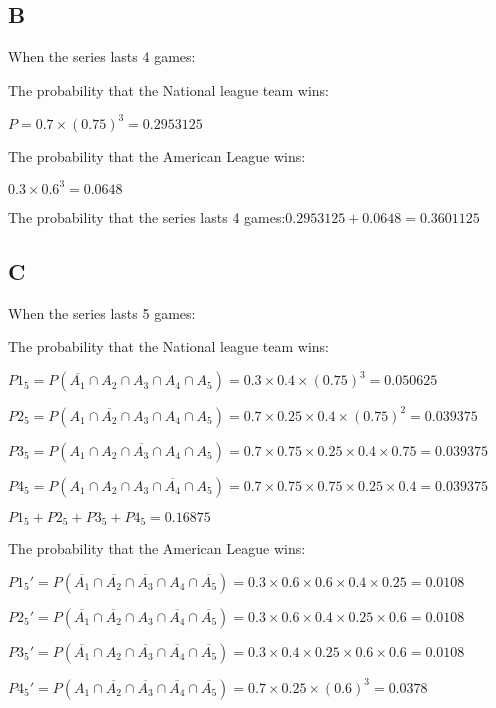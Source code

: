 \documentclass{article}
\begin{document}
	\newpage
	
	\subsection*{B}
	
	When the series lasts 4 games:
	
	The probability that the National league team wins:
	
	$P=0.7\times(0.75)^3=0.2953125$
	
	The probability that the American League wins:
	
	$0.3\times 0.6^3=0.0648$
	
	The probability that the series lasts 4 games:$0.2953125+0.0648=0.3601125$
	
	\subsection*{C}
	
	When the series lasts 5 games:
	
	The probability that the National league team wins:
	
	$P1_5=P(\overline{A_1}\cap A_2\cap A_3\cap A_4 \cap A_5)=0.3\times 0.4\times(0.75)^3=0.050625$
	
	$P2_5=P(A_1\cap \overline{A_2}\cap A_3\cap A_4\cap A_5)=0.7\times 0.25\times 0.4\times(0.75)^2=0.039375$
	
	$P3_5=P(A_1\cap A_2\cap \overline{A_3}\cap A_4\cap A_5)=0.7\times 0.75\times 0.25\times0.4\times 0.75=0.039375$
	
	$P4_5=P(A_1\cap A_2\cap A_3\cap \overline{A_4}\cap A_5)=0.7\times 0.75\times 0.75\times 0.25\times0.4=0.039375$
	
	$P1_5+P2_5+P3_5+P4_5=0.16875$	

	The probability that the American League wins:
	
	$P1_5'=P(\overline{A_1}\cap \overline{A_2}\cap \overline{A_3}\cap A_4 \cap \overline{A_5})=0.3\times 0.6\times 0.6\times 0.4\times 0.25=0.0108$

	$P2_5'=P(\overline{A_1} \cap \overline{A_2} \cap A_3\cap \overline{A_4} \cap \overline{A_5})=0.3\times 0.6\times 0.4\times 0.25\times 0.6=0.0108$
		
	$P3_5'=P(\overline{A_1}\cap A_2\cap \overline{A_3}\cap \overline{A_4} \cap \overline{A_5})=0.3\times 0.4\times 0.25\times 0.6\times 0.6=0.0108$

	$P4_5'=P(A_1\cap \overline{A_2}\cap \overline{A_3}\cap \overline{A_4} \cap \overline{A_5})=0.7\times 0.25\times(0.6)^3=0.0378$
	
\end{document}

